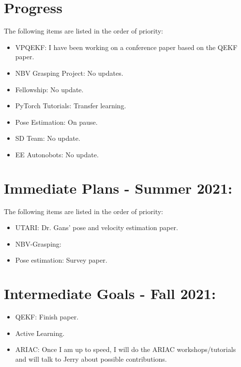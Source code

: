 \documentclass[11pt]{article}
\begin{document}
\section{Progress}
The following items are listed in the order of priority:
\begin{itemize}
      \item VPQEKF: I have been working on a conference paper based on the QEKF
paper.

      \item NBV Grasping Project: No updates.
      \item Fellowship: No update.
      \item PyTorch Tutorials: Transfer learning.
      \item Pose Estimation: On pause.
      \item SD Team: No update.
      \item EE Autonobots: No update.
\end{itemize}


\section{Immediate Plans - Summer 2021:}
The following items are listed in the order of priority:

\begin{itemize}
      \item UTARI: Dr. Gans' pose and velocity estimation paper.
      \item NBV-Grasping:
      \item Pose estimation: Survey paper.
\end{itemize}

\section{Intermediate Goals - Fall 2021:}
\begin{itemize}
      \item QEKF: Finish paper.
      \item Active Learning.
      \item ARIAC: Once I am up to speed, I will do the ARIAC workshops/tutorials and will talk to Jerry about possible contributions.
\end{itemize}


\newpage


\end{document}
